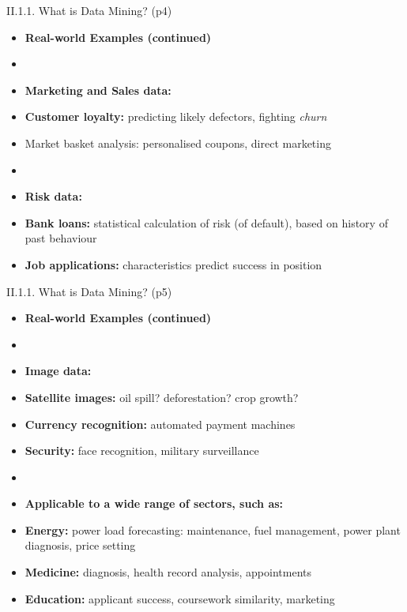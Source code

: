 \documentclass[handout]{beamer}
\newcommand{\strong}[1]{\textbf{\color{teal} #1}}
\newcommand{\stronger}[1]{\textbf{\color{purple} #1}}
\begin{document}
\begin{frame}{II.1.1. What is Data Mining? (p4)}
\begin{itemize}
\item[] \strong{Real-world Examples (continued)}
\item[]
\item[] \stronger{Marketing and Sales data:}
\item \textbf{Customer loyalty:} predicting likely defectors, fighting \emph{churn}
\item Market basket analysis: personalised coupons, direct marketing
\item[]
\item[] \stronger{Risk data:}
\item \textbf{Bank loans:} statistical calculation of risk (of default), based on history of past behaviour
\item \textbf{Job applications:} characteristics predict success in position
\end{itemize}
\end{frame}
\begin{frame}{II.1.1. What is Data Mining? (p5)}
\begin{itemize}
\item[] \strong{Real-world Examples (continued)}
\item[]
\item[] \stronger{Image data:}
\item \textbf{Satellite images:} oil spill? deforestation? crop growth?
\item \textbf{Currency recognition:} automated payment machines
\item \textbf{Security:} face recognition, military surveillance
\item[]
\item[] \strong{Applicable to a wide range of sectors, such as:}
\item \textbf{Energy:} power load forecasting: maintenance, fuel management, power plant diagnosis, price setting
\item \textbf{Medicine:} diagnosis, health record analysis, appointments
\item \textbf{Education:} applicant success, coursework similarity, marketing
\end{itemize}
\end{frame}
\end{document}
